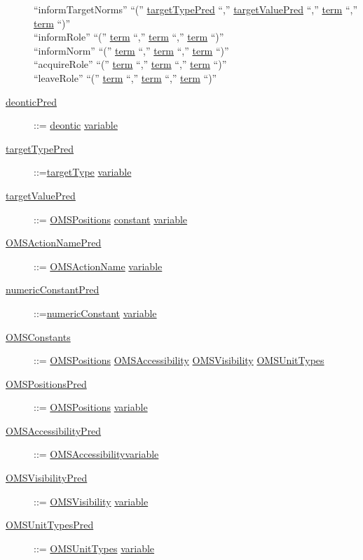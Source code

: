 \begin{description}
		``informTargetNorms'' ``('' \underline{targetTypePred} ``,'' \underline{targetValuePred} ``,'' \underline{term} ``,'' \underline{term} ``)'' \textbar\\
		``informRole'' ``('' \underline{term} ``,'' \underline{term} ``,'' \underline{term} ``)'' \textbar\\
		``informNorm'' ``('' \underline{term} ``,'' \underline{term} ``,'' \underline{term} ``)'' \textbar\\
		``acquireRole'' ``('' \underline{term} ``,'' \underline{term} ``,'' \underline{term} ``)'' \textbar\\
		``leaveRole'' ``('' \underline{term} ``,'' \underline{term} ``,'' \underline{term} ``)'' \textbar


\item[\underline{deonticPred}]::= \underline{deontic} \textbar \underline{variable}

\item[\underline{targetTypePred}]::=\underline{targetType} \textbar  \underline{variable}

\item[\underline{targetValuePred}] ::= \underline{OMSPositions} \textbar \underline{constant} \textbar  \underline{variable}

\item[\underline{OMSActionNamePred}] ::= \underline{OMSActionName} \textbar  \underline{variable}

\item[\underline{numericConstantPred}] ::=\underline{numericConstant} \textbar  \underline{variable}

\item[\underline{OMSConstants}] ::= \underline{OMSPositions} \textbar \underline{OMSAccessibility} \textbar \underline{OMSVisibility} \textbar 
		\underline{OMSUnitTypes}    %

\item[\underline{OMSPositionsPred}] ::= \underline{OMSPositions} \textbar \underline{variable}

\item[\underline{OMSAccessibilityPred}] ::= \underline{OMSAccessibility}\textbar \underline{variable}

\item[\underline{OMSVisibilityPred}] ::= \underline{OMSVisibility} \textbar  \underline{variable}

\item[\underline{OMSUnitTypesPred}] ::= \underline{OMSUnitTypes} \textbar  \underline{variable}



\end{description}
